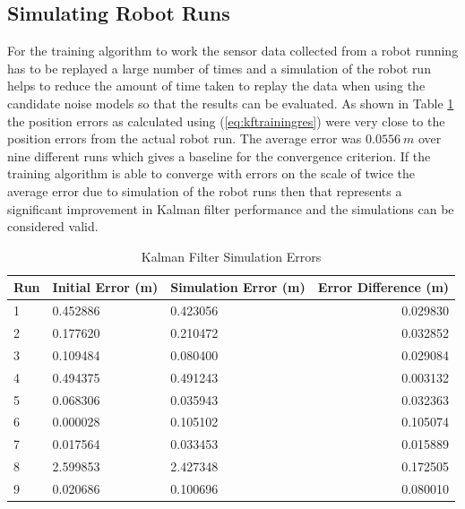 \subsection{Simulating Robot Runs}
\label{sec:kfSimulation}
For the training algorithm to work the sensor data collected from a robot running has to be replayed a large number of times and a simulation of the robot run helps to reduce the amount of time taken to replay the data when using the candidate noise models so that the results can be evaluated. As shown in Table \ref{tab:kfSimulationErrors} the position errors as calculated using (\ref{eq:kftrainingres}) were very close to the position errors from the actual robot run. The average error was $0.0556~m$ over nine different runs which gives a baseline for the convergence criterion. If the training algorithm is able to converge with errors on the scale of twice the average error due to simulation of the robot runs then that represents a significant improvement in Kalman filter performance and the simulations can be considered valid.

\begin{table}[ht!]
\caption{Kalman Filter Simulation Errors}
\small
\centering
\begin{tabular}{@{}lllr@{}} \toprule
Run & Initial Error (m) & Simulation Error (m) & Error Difference (m) \\ \midrule
1   & 0.452886          & 0.423056             & 0.029830             \\
2   & 0.177620          & 0.210472             & 0.032852             \\
3   & 0.109484          & 0.080400             & 0.029084             \\
4   & 0.494375          & 0.491243             & 0.003132             \\
5   & 0.068306          & 0.035943             & 0.032363             \\
6   & 0.000028          & 0.105102             & 0.105074             \\
7   & 0.017564          & 0.033453             & 0.015889             \\
8   & 2.599853          & 2.427348             & 0.172505             \\
9   & 0.020686          & 0.100696             & 0.080010             \\ \bottomrule
\end{tabular}
\label{tab:kfSimulationErrors}
\end{table}

